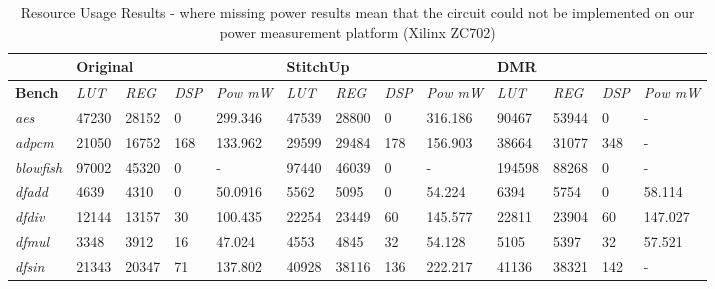 \begin{table}[t]
\small
\singlespace
\centering
\caption{Resource Usage Results - where missing power results mean that the circuit could not be implemented on our power measurement platform (Xilinx ZC702)}
\label{tab:resources}
\tabcolsep=0.11cm
\begin{tabular}{@{}|l|l|l|l|l|l|l|l|l|l|l|l|l|@{}}
\toprule
                    & \multicolumn{4}{l|}{\textbf{Original}}                      & \multicolumn{4}{l|}{\textbf{StitchUp}}                      & \multicolumn{4}{l|}{\textbf{DMR}}                           \\ \midrule
\textbf{Bench}      & \textit{LUT} & \textit{REG} & \textit{DSP} &\textit{Pow mW} & \textit{LUT} & \textit{REG} & \textit{DSP} &\textit{Pow mW}& \textit{LUT} & \textit{REG} & \textit{DSP} & \textit{Pow mW}   \\ \midrule
\textit{aes}        & 47230        & 28152        & 0            & 299.346        & 47539        & 28800        & 0            & 316.186        & 90467        & 53944        & 0            & -              \\ \midrule
\textit{adpcm}      & 21050        & 16752        & 168          & 133.962        & 29599        & 29484        & 178          & 156.903        & 38664        & 31077        & 348          & -              \\ \midrule
\textit{blowfish}   & 97002        & 45320        & 0            & -              & 97440        & 46039        & 0            & -              & 194598       & 88268        & 0            & -              \\ \midrule
\textit{dfadd}      & 4639         & 4310         & 0            & 50.0916        & 5562         & 5095         & 0            & 54.224         & 6394         & 5754         & 0            & 58.114         \\ \midrule
\textit{dfdiv}      & 12144        & 13157        & 30           & 100.435        & 22254        & 23449        & 60           & 145.577        & 22811        & 23904        & 60           & 147.027        \\ \midrule
\textit{dfmul}      & 3348         & 3912         & 16           & 47.024         & 4553         & 4845         & 32           & 54.128         & 5105         & 5397         & 32           & 57.521         \\ \midrule
\textit{dfsin}      & 21343        & 20347        & 71           & 137.802        & 40928        & 38116        & 136          & 222.217        & 41136        & 38321        & 142          & -              \\ \midrule

\end{tabular}
\end{table}
